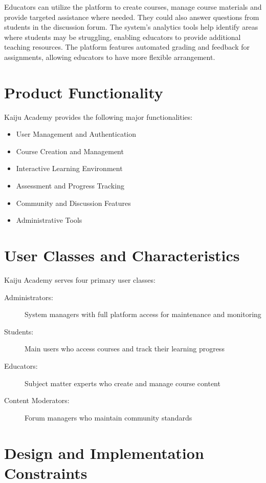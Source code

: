 \documentclass[a4paper, 11pt]{scrreprt}
\begin{document}
Educators can utilize the platform to create courses, manage course materials and provide targeted assistance where needed. They could also answer questions from students in the discussion forum. The system's analytics tools help identify areas where students may be struggling, enabling educators to provide additional teaching resources. The platform features automated grading and feedback for assignments, allowing educators to have more flexible arrangement. 

\section{Product Functionality}

Kaiju Academy provides the following major functionalities:

\begin{itemize}
    \item User Management and Authentication
    \item Course Creation and Management
    \item Interactive Learning Environment
    \item Assessment and Progress Tracking
    \item Community and Discussion Features
    \item Administrative Tools
\end{itemize}

\section{User Classes and Characteristics}

Kaiju Academy serves four primary user classes:

\begin{description}
    \item[Administrators:] System managers with full platform access for maintenance and monitoring
    \item[Students:] Main users who access courses and track their learning progress
    \item[Educators:] Subject matter experts who create and manage course content
    \item[Content Moderators:] Forum managers who maintain community standards
\end{description}

\section{Design and Implementation Constraints}
\end{document}
